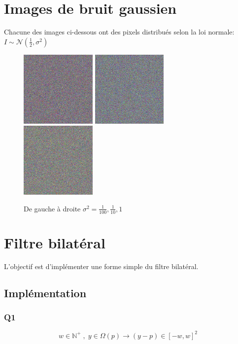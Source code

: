 \documentclass{article}
\begin{document}
\newpage
\section{Images de bruit gaussien}
Chacune des images ci-dessous ont des pixels distribués selon la loi normale: $I \sim \mathcal{N}(\frac{1}{2}, \sigma^2)$

\begin{figure}[h]
	\includegraphics[width=0.33\textwidth]{noise001.png}
	\includegraphics[width=0.33\textwidth]{noise01.png}
	\includegraphics[width=0.33\textwidth]{noise10.png}
  \caption{De gauche à droite $\sigma^2 = \frac{1}{100}, \frac{1}{10}, 1$}
\end{figure}

\section{Filtre bilatéral}
L'objectif est d'implémenter une forme simple du filtre bilatéral.
\subsection{Implémentation}
\subsubsection*{Q1}
$$w \in \mathbb{N}^+ \;, \; y \in \Omega(p) \rightarrow (y-p) \in {[{-w}, w]}^2$$
\end{document}
